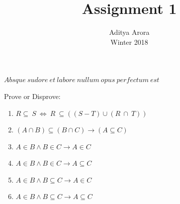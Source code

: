 \documentclass[12pt]{article}
\newenvironment{problem}[2][Problem]{\begin{trivlist}
\item[\hskip \labelsep {\bfseries #1}\hskip \labelsep {\bfseries #2.}]}{\end{trivlist}}
\begin{document}
 
 
\title{Assignment 1}%
\author{Aditya Arora\\ %
Winter 2018} %
 
\maketitle
\begin{center}
    $Absque\ sudore\ et\ labore\ nullum\ opus\ perfectum\ est$
\end{center}
\begin{problem}{1}
Prove or Disprove:
\begin{enumerate}[label=\alph*)]
    \item $ R \subseteq \ S\ \Leftrightarrow \ R \ \subseteq ((S-T)\cup(R\ \cap\ T)) $
    \item $(A \cap B) \subseteq (B \cap C) \longrightarrow (A \subseteq C)$ 
    \item $A \in B \wedge B \in C \longrightarrow A \in C$
    \item $A \in B \wedge B \in C \longrightarrow A \subseteq C$
    \item $A \in B \wedge B \subseteq C \longrightarrow A \in C$
    \item $A \in B \wedge B \subseteq C \longrightarrow A \subseteq C$
\end{enumerate}
\end{problem}
\end{document}
